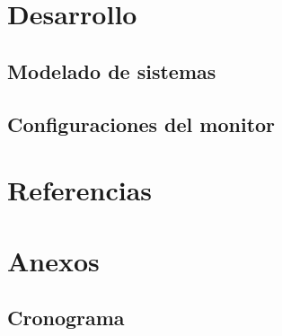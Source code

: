 \section{Desarrollo}
\subsection{Modelado de sistemas}

 

\subsection{Configuraciones del monitor}

\section{Referencias} 
 

\section{Anexos} 
\subsection{Cronograma}
    

